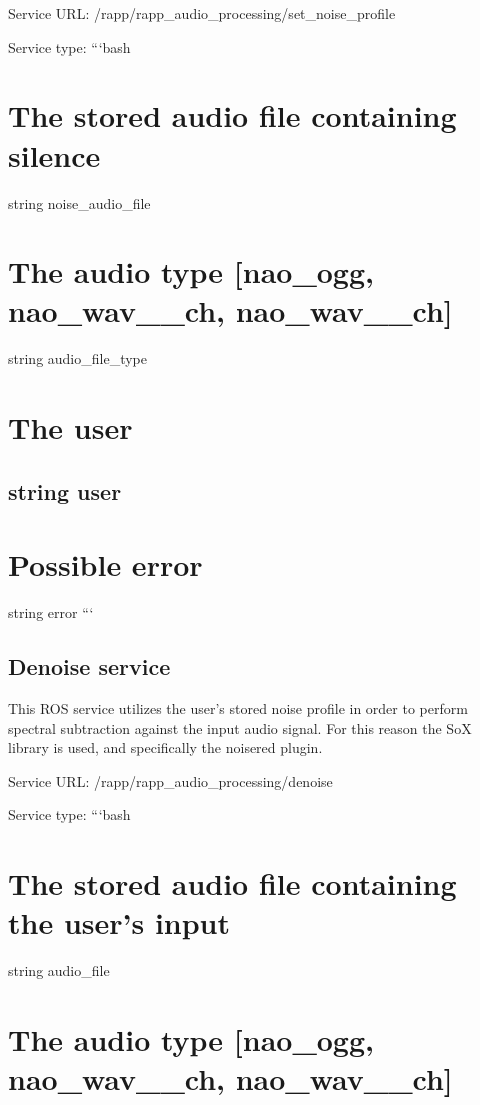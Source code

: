 Service U\-R\-L\-: {\ttfamily /rapp/rapp\-\_\-audio\-\_\-processing/set\-\_\-noise\-\_\-profile}

Service type\-: ```bash \section*{The stored audio file containing silence}

string noise\-\_\-audio\-\_\-file \section*{The audio type \mbox{[}nao\-\_\-ogg, nao\-\_\-wav\-\_\-\_\-ch, nao\-\_\-wav\-\_\-\_\-ch\mbox{]}}

string audio\-\_\-file\-\_\-type \section*{The user}

\subsection*{string user }

\section*{Possible error}

string error ```

\subsection*{Denoise service}

This R\-O\-S service utilizes the user’s stored noise profile in order to perform spectral subtraction against the input audio signal. For this reason the So\-X library is used, and specifically the noisered plugin.

Service U\-R\-L\-: {\ttfamily /rapp/rapp\-\_\-audio\-\_\-processing/denoise}

Service type\-: ```bash \section*{The stored audio file containing the user’s input}

string audio\-\_\-file \section*{The audio type \mbox{[}nao\-\_\-ogg, nao\-\_\-wav\-\_\-\_\-ch, nao\-\_\-wav\-\_\-\_\-ch\mbox{]}}

